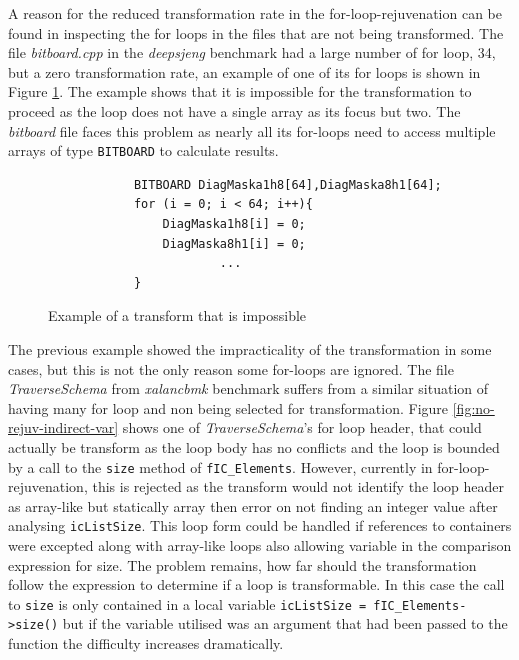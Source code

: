 \documentclass[bsc,frontabs,singlespacing,twoside,parskip,deptreport]{infthesis}
\begin{document}
A reason for the reduced transformation rate in the for-loop-rejuvenation can be found in inspecting the for loops in the files that are not being transformed. The file \textit{bitboard.cpp} in the \textit{deepsjeng} benchmark had a large number of for loop, 34, but a zero transformation rate, an example of one of its for loops is shown in Figure \ref{fig:code-untrans-example}. The example shows that it is impossible for the transformation to proceed as the loop does not have a single array as its focus but two. The \textit{bitboard} file faces this problem as nearly all its for-loops need to access multiple arrays of type \texttt{BITBOARD} to calculate results.

\begin{figure}[!ht]
    \centering
    \begin{verbatim}
            BITBOARD DiagMaska1h8[64],DiagMaska8h1[64];
            for (i = 0; i < 64; i++){
                DiagMaska1h8[i] = 0;
                DiagMaska8h1[i] = 0;
                        ...
            }
    \end{verbatim}
    \caption{Example of a transform that is impossible}
    \label{fig:code-untrans-example}
\end{figure}

The previous example showed the impracticality of the transformation in some cases, but this is not the only reason some for-loops are ignored. The file \textit{TraverseSchema} from \textit{xalancbmk} benchmark suffers from a similar situation of having many for loop and non being selected for transformation. Figure \ref{fig:no-rejuv-indirect-var} shows one of \textit{TraverseSchema}'s for loop header, that could actually be transform as the loop body has no conflicts and the loop is bounded by a call to the \texttt{size} method of \texttt{fIC\_Elements}. However, currently in for-loop-rejuvenation, this is rejected as the transform would not identify the loop header as array-like but statically array then error on not finding an integer value after analysing \texttt{icListSize}. This loop form could be handled if references to containers were excepted along with array-like loops also allowing variable in the comparison expression for size. The problem remains, how far should the transformation follow the expression to determine if a loop is transformable. In this case the call to \texttt{size} is only contained in a local variable \texttt{icListSize = fIC\_Elements->size()} but if the variable utilised was an argument that had been passed to the function the difficulty increases dramatically. 
\end{document}

